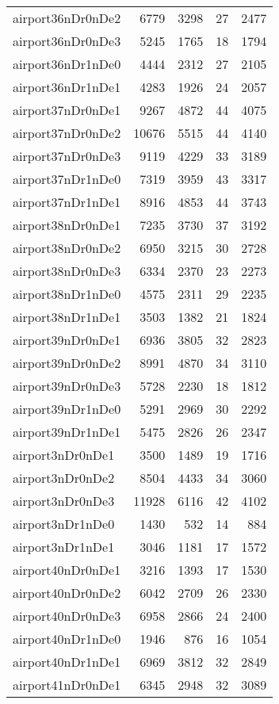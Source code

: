 \documentclass[../../../thesis.tex]{subfiles}
\begin{document}
\begin{longtable}{lrrrr}
airport36nDr0nDe2 & 6779 & 3298 & 27 & 2477 \\
airport36nDr0nDe3 & 5245 & 1765 & 18 & 1794 \\
airport36nDr1nDe0 & 4444 & 2312 & 27 & 2105 \\
airport36nDr1nDe1 & 4283 & 1926 & 24 & 2057 \\
airport37nDr0nDe1 & 9267 & 4872 & 44 & 4075 \\
airport37nDr0nDe2 & 10676 & 5515 & 44 & 4140 \\
airport37nDr0nDe3 & 9119 & 4229 & 33 & 3189 \\
airport37nDr1nDe0 & 7319 & 3959 & 43 & 3317 \\
airport37nDr1nDe1 & 8916 & 4853 & 44 & 3743 \\
airport38nDr0nDe1 & 7235 & 3730 & 37 & 3192 \\
airport38nDr0nDe2 & 6950 & 3215 & 30 & 2728 \\
airport38nDr0nDe3 & 6334 & 2370 & 23 & 2273 \\
airport38nDr1nDe0 & 4575 & 2311 & 29 & 2235 \\
airport38nDr1nDe1 & 3503 & 1382 & 21 & 1824 \\
airport39nDr0nDe1 & 6936 & 3805 & 32 & 2823 \\
airport39nDr0nDe2 & 8991 & 4870 & 34 & 3110 \\
airport39nDr0nDe3 & 5728 & 2230 & 18 & 1812 \\
airport39nDr1nDe0 & 5291 & 2969 & 30 & 2292 \\
airport39nDr1nDe1 & 5475 & 2826 & 26 & 2347 \\
airport3nDr0nDe1 & 3500 & 1489 & 19 & 1716 \\
airport3nDr0nDe2 & 8504 & 4433 & 34 & 3060 \\
airport3nDr0nDe3 & 11928 & 6116 & 42 & 4102 \\
airport3nDr1nDe0 & 1430 & 532 & 14 & 884 \\
airport3nDr1nDe1 & 3046 & 1181 & 17 & 1572 \\
airport40nDr0nDe1 & 3216 & 1393 & 17 & 1530 \\
airport40nDr0nDe2 & 6042 & 2709 & 26 & 2330 \\
airport40nDr0nDe3 & 6958 & 2866 & 24 & 2400 \\
airport40nDr1nDe0 & 1946 & 876 & 16 & 1054 \\
airport40nDr1nDe1 & 6969 & 3812 & 32 & 2849 \\
airport41nDr0nDe1 & 6345 & 2948 & 32 & 3089 \\

\end{longtable}
\end{document}
